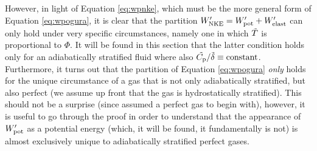 \documentclass[12pt]{article}
\newcommand{\wpnke}{W^\prime_{\rm NKE}}
\newcommand{\wppot}{W^\prime_{\rm pot}}
\newcommand{\wpelast}{W^\prime_{\rm elast}}
\begin{document}
However, in light of Equation \eqref{eq:wpnke}, which must be the more general form of Equation \eqref{eq:wpogura}, it is clear that the partition $\wpnke = \wppot + \wpelast$ can only hold under very specific circumstances, namely one in which $\tilde{T}$ is proportional to $\Phi$. It will be found in this section that the latter condition holds only for an adiabatically stratified fluid where also $\tilde{C_{\rm{p}}}/\tilde{\delta}\equiv\text{constant}$. Furthermore, it turns out that the partition of Equation \eqref{eq:wpogura} \textit{only} holds for the unique circumstance of a gas that is not only adiabatically stratified, but also perfect (we assume up front that the gas is hydrostatically stratified). This should not be a surprise (since \citealt{Ogura1962} assumed a perfect gas to begin with), however, it is useful to go through the proof in order to understand that the appearance of $\wppot$ as a potential energy (which, it will be found, it fundamentally is not) is almost exclusively unique to adiabatically stratified perfect gases. 
\end{document}
